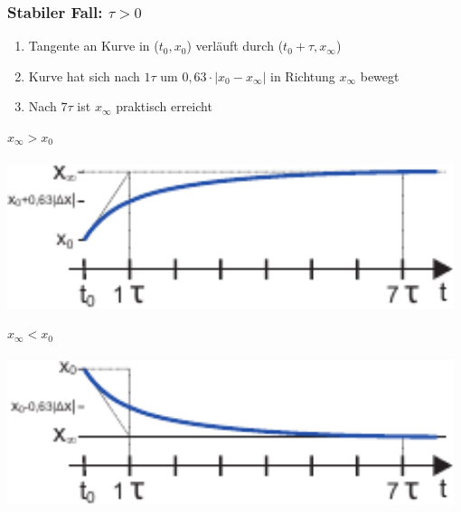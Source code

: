 \documentclass[a4paper,twocolumn,10pt]{article}
\begin{document}
\subsubsection*{Stabiler Fall: $\tau>0$}
\begin{enumerate}[label=-,leftmargin=3mm]
	\item Tangente an Kurve in ($t_0,x_0$) verläuft durch ($t_0+\tau,x_\infty$)
	\item Kurve hat sich nach $1\tau$ um $0,63\cdot |x_0-x_\infty|$ in Richtung $x_\infty$ bewegt
	\item Nach $7\tau$ ist $x_\infty$ praktisch erreicht
\end{enumerate}
\begin{minipage}[t]{0.23\textwidth}
$x_\infty > x_0$\\\\
\includegraphics[width=0.98\textwidth]{Grafiken/Zeitverlauf1}\\
\end{minipage}
\hfill
\begin{minipage}[t]{0.23\textwidth}
$x_\infty < x_0$\\\\
\includegraphics[width=0.98\textwidth]{Grafiken/Zeitverlauf2}\\
\end{minipage}
\end{document}
